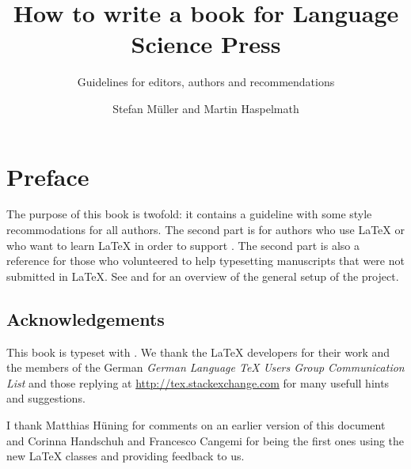 \documentclass[ number=??
                ,series=lnls,
                ,isbn=xxx-x-xxxxxx-xx-x,
                ,url=http://langsci-press.org/catalog/book/14,
	        ,output=long    %
	        ,draftmode  
		  ]{LSP/langsci}
\title{How to write a book for Language Science Press}
\subtitle{Guidelines for editors, authors and \latex recommendations}
\author{Stefan Müller and Martin Haspelmath}
\newcommand{\latex}{\LaTeX\xspace}
\begin{document}
               
         
                                                                           
                                  
\maketitle                


\chapter*{Preface}


The purpose of this book is twofold: it contains a guideline with some style recommodations for all
authors. The second part is for authors who use \latex or who want to learn \latex in order to
support \lsp. The second part is also a reference for those who volunteered to help typesetting
manuscripts that were not submitted in \latex. See  and  for an overview of the
general setup of the project.

\section*{Acknowledgements}




This book is typeset with \xelatex. We thank the \latex developers for their work and the members of the German \textit{German
  Language TeX Users Group Communication List} and those replying at \url{http://tex.stackexchange.com} for many usefull hints and suggestions.

I thank Matthias Hüning for comments on an earlier version of this document and Corinna Handschuh
and Francesco Cangemi for being the first ones using the new \latex classes and providing feedback
to us.

\bigskip
\end{document}
